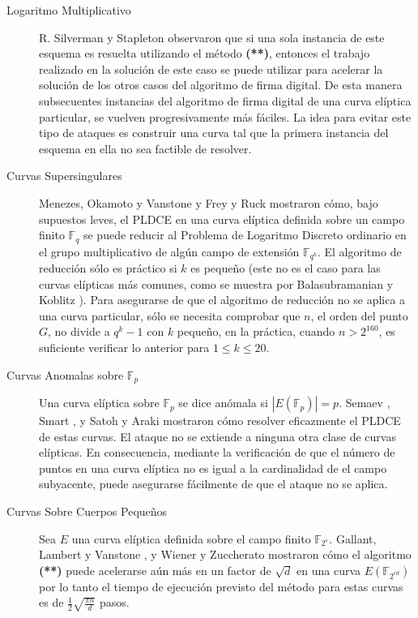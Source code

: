 \documentclass[11pt]{article}
\newcommand{\F}{\mathbb{F}}
\newcommand{\Fq}{\mathbb{F}_q}
\newcommand{\Fp}{\mathbb{F}_p}
\numberwithin{equation}{section} %
\numberwithin{figure}{section} %
\numberwithin{table}{section} %
\begin{document}
\begin{description}
			\item[Logaritmo Multiplicativo] R. Silverman y Stapleton \cite{SS97} observaron que si una sola instancia de este esquema es resuelta utilizando el método \textbf{(**)}, entonces el trabajo realizado en la solución de este caso se puede utilizar para acelerar la solución de los otros casos del algoritmo de firma digital. De esta manera subsecuentes instancias del algoritmo de firma digital de una curva elíptica particular, se vuelven progresivamente más fáciles. La idea para evitar este tipo de ataques es construir una curva tal que la primera instancia del esquema en ella no sea factible de resolver.

			\item[Curvas Supersingulares] Menezes, Okamoto y Vanstone \cite{Men12} y Frey y Ruck \cite{FR94} mostraron cómo, bajo supuestos leves, el PLDCE en una curva elíptica definida sobre un campo finito $\Fq$ se puede reducir al Problema de Logaritmo Discreto ordinario en el grupo multiplicativo de algún campo de extensión $\F_{q^k}$. El algoritmo de reducción sólo es práctico si $k$ es pequeño (este no es el caso para las curvas elípticas más comunes, como se muestra por Balasubramanian y Koblitz \cite{BK}). Para asegurarse de que el algoritmo de reducción no se aplica a una curva particular, sólo se necesita comprobar que $n$, el orden del punto $G$, no divide a $q^k-1$ con $k$ pequeño, en la práctica, cuando $n>2^{160}$, es suficiente verificar lo anterior para $1\leq k\leq 20$.

			\item[Curvas Anomalas sobre $\Fp$] Una curva elíptica sobre $\Fp$ se dice anómala si $|E(\Fp)|=p$. Semaev \cite{S98}, Smart \cite{Sma99}, y Satoh y Araki \cite{SA98} mostraron cómo resolver eficazmente el PLDCE de estas curvas. El ataque no se extiende a ninguna otra clase de curvas elípticas. En consecuencia, mediante la verificación de que el número de puntos en una curva elíptica no es igual a la cardinalidad de el campo subyacente, puede asegurarse fácilmente de que el ataque no se aplica.

			\item[Curvas Sobre Cuerpos Pequeños] Sea $E$ una curva elíptica definida sobre el campo finito $\F_{2^e}$. Gallant, Lambert y Vanstone \cite{GLV}, y Wiener y Zuccherato \cite{WZ} mostraron cómo el algoritmo \textbf{(**)} puede acelerarse aún más en un factor de $\sqrt{d}$ en una curva $E(\F_{2^{ed}})$ por lo tanto el tiempo de ejecución previsto del método para estas curvas es de $\frac{1}{2}\sqrt{\frac{\pi n}{d}}$ pasos. 


\end{description}
\end{document}
